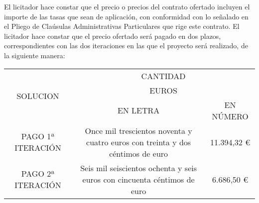 El licitador hace constar que el precio o precios del contrato ofertado incluyen el importe de las tasas
que sean de aplicación, con conformidad con lo señalado en el Pliego de Claúsulas Administrativas
Particulares que rige este contrato.
El licitador hace constar que el precio ofertado será pagado en dos plazos, correspondientes con las
dos iteraciones en las que el proyecto será realizado, de la siguiente manera:

\begin{table}[h]
\begin{tabular}{ccc}
\multirow{3}{*}{SOLUCION} & \multicolumn{2}{c}{CANTIDAD}                                                                 \\
                          & \multicolumn{2}{c}{EUROS}                                                                    \\
                          & EN LETRA                                                                       & EN NÚMERO   \\
PAGO 1ª ITERACIÓN         & Once mil trescientos noventa y cuatro euros con treinta y dos céntimos de euro & 11.394,32 € \\
PAGO 2ª ITERACIÓN         & Seis mil seiscientos ochenta y seis euros con cincuenta céntimos de euro       & 6.686,50 € 
\end{tabular}
\end{table}
